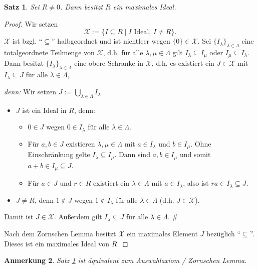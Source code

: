 \documentclass[a4paper, twoside, 11pt, ngerman]{report}
\theoremstyle{definistyle}
\newtheorem{satz}{Satz}[section]
\newtheorem{anm}[satz]{Anmerkung}
\theoremstyle{remark}
\newenvironment{denn}%
  {\par\textit{denn:}}%
  {\hfill\#\par}
\begin{document}
\begin{satz}\label{satz:maximales_ideal_existiert}
Sei $R \neq 0$. Dann besitzt $R$ ein maximales Ideal.
\end{satz}

\begin{proof}
Wir setzen \[\mathcal{X} := \{ I \subseteq R \mid I \text{ Ideal, } I \neq R \}.\] $\mathcal{X}$ ist bzgl. "`$\subseteq$"' halbgeordnet und ist nichtleer wegen $\{0\} \in \mathcal{X}$. Sei $\{ I_\lambda \}_{\lambda \in \Lambda}$ eine totalgeordnete Teilmenge von $\mathcal{X}$, d.h. für alle $\lambda, \mu \in \Lambda$ gilt $I_\lambda \subseteq I_\mu$ oder $I_\mu \subseteq I_\lambda$. Dann besitzt $\{ I_\lambda \}_{\lambda \in \Lambda}$ eine obere Schranke in $\mathcal{X}$, d.h. es existiert ein $J \in \mathcal{X}$ mit $I_\lambda \subseteq J$ für alle $\lambda \in \Lambda$,
\begin{denn}
Wir setzen $J := \bigcup_{\lambda \in \Lambda} I_\lambda$.
\begin{itemize}
    \item $J$ ist ein Ideal in $R$, denn:
    \begin{itemize}
        \item $0 \in J$ wegen $0 \in I_\lambda$ für alle $\lambda \in \Lambda$.
        \item Für $a, b \in J$ existieren $\lambda, \mu \in \Lambda$ mit $a \in I_\lambda$ und $b \in I_\mu$. Ohne Einschränkung gelte $I_\lambda \subseteq I_\mu$. Dann sind $a, b \in I_\mu$ und somit $a + b \in I_\mu \subseteq J$.
        \item Für $a \in J$ und $r \in R$ existiert ein $\lambda \in \Lambda$ mit $a \in I_\lambda$, also ist $r a \in I_\lambda \subseteq J$.
    \end{itemize}
    \item $J \neq R$, denn $1\not\in J$ wegen $1\not\in I_\lambda$ für alle $\lambda \in \Lambda$ (d.h. $J \in \mathcal{X}$).
\end{itemize}
Damit ist $J\in\mathcal{X}$. Außerdem gilt  $I_\lambda \subseteq J$ für alle $\lambda \in \Lambda$.
\end{denn}

Nach dem Zornschen Lemma besitzt $\mathcal{X}$ ein maximales Element $J$ bezüglich "`$\subseteq$"'. Dieses ist ein maximales Ideal von $R$.
\end{proof}


\begin{anm}\label{anm:aussagen_aequivalent}
Satz \ref{satz:maximales_ideal_existiert} ist äquivalent zum Auswahlaxiom / Zornschen Lemma.
\end{anm}
\end{document}
